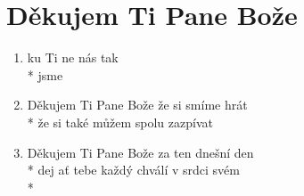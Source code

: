 \section{Děkujem Ti Pane Bože}
\begin{enumerate}
\item {}ku Ti ne   nás  tak \\*
 jsme        
\item Děkujem Ti Pane Bože že si smíme hrát \\*
že si také můžem spolu zazpívat 
\item Děkujem Ti Pane Bože za ten dnešní den \\*
dej ať tebe každý chválí v srdci svém \\*
\end{enumerate}
